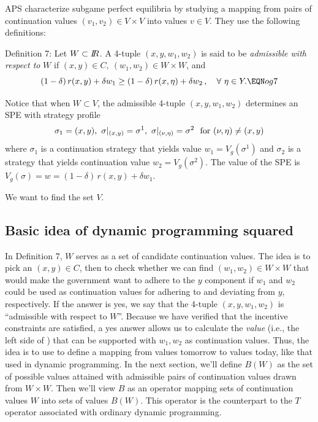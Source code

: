 APS characterize subgame perfect equilibria by studying a mapping
from pairs of continuation
 values $(v_1,v_2)\in V \times V$ into values $v\in V$.  They use the following
definitions:

\medskip\noindent
{\sc Definition 7:}  Let $W\subset  {I\kern-0.3em R}$.  A 4-tuple $(x,y,w_1,w_2)$ is said to be
{\it admissible with respect to\/} $W$ if $(x,y)\in C,\ (w_1,w_2) \in
    W\times W$, and
$$(1-\delta)\, r(x,y)
+\delta w_1 \geq (1-\delta)\, r(x,\eta) + \delta w_2\,,
\quad\forall\ \eta\in Y . \EQN og7$$

\medskip %
Notice that when $W\subset V$,
 the admissible 4-tuple $(x,y,w_1,w_2)$
determines an SPE with strategy profile
$$\sigma_1 = (x,y),\ \sigma\vert_{(x,y)} = \sigma^1,\ \sigma\vert_{(\nu,\eta)}
= \sigma^2\ \hbox{ for } (\nu,\eta)\not= (x,y)$$ where $\sigma_1$
is a continuation strategy that yields  value $w_1 = V_g
(\sigma^1)$ and $\sigma_2$ is a strategy that yields
continuation value $w_2 = V_g(\sigma^2)$.   The value of the
SPE is $V_g(\sigma) = w = (1-\delta)\, r(x,y)
 + \delta w_1$.

We want to find the set $V$.

\medskip
\subsection{Basic idea of dynamic programming squared}
 In Definition 7, $W$ serves as a set of candidate
continuation values. The idea is to pick an $(x,y)\in C$,  then to
check whether we can find  $(w_1, w_2)  \in W \times W $
that would make the government want to
adhere to the $y$ component if $w_1$ and  $w_2$ could be used as
continuation values for adhering to and deviating from $y$, respectively. If
the answer is yes, we say that the 4-tuple $(x,y,w_1,w_2)$ is
``admissible with  respect to $W$''.  Because we have
verified that the  incentive constraints are satisfied, a yes answer allows us
to  calculate the {\it value\/} (i.e., the left side of )
that can be supported with $w_1, w_2$ as continuation values.
Thus, the idea is to use  to define a mapping  from values
tomorrow to values today, like that used in dynamic programming.
In the next section, we'll define $B(W)$ as the set of possible
values attained with admissible pairs of continuation values drawn from
$W \times W$.  Then we'll view  $B$ as an operator mapping sets of continuation values $W$ into sets of values $B(W)$.
This operator is the counterpart to  the
$T$ operator associated with ordinary dynamic
programming.  %

